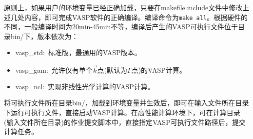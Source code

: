 原则上，如果用户的环境变量已经正确加载，只要在\textrm{makefile.include}文件中修改上述几处内容，即可完成\textrm{VASP}软件的正确编译。编译命令为\texttt{make all}。根据硬件的不同，一般编译时间为20\textrm{min}-45\textrm{min}不等，编译后产生的\textrm{VASP}可执行文件位于目录\textrm{bin/}下，版本依次为：
\begin{itemize}
	\item \textrm{vasp\_std}:~标准版，最通用的\textrm{VASP}版本。
	\item \textrm{vasp\_gam}:~允许仅有单个$\vec k$点(默认为$\Gamma$点)的\textrm{VASP}计算。
	\item \textrm{vasp\_ncl}:~实现非线性光学计算的\textrm{VASP}计算。
\end{itemize}
将可执行文件所在目录\textrm{bin/}，加载到环境变量并生效后，即可在输入文件所在目录下运行可执行文件，直接启动\textrm{VASP}计算。在高性能计算环境下，可在计算目录(输入文件所在目录)的作业提交脚本中，直接指定\textrm{VASP}可执行文件路径后，提交计算任务。
%
%
%
%
%
%
%
